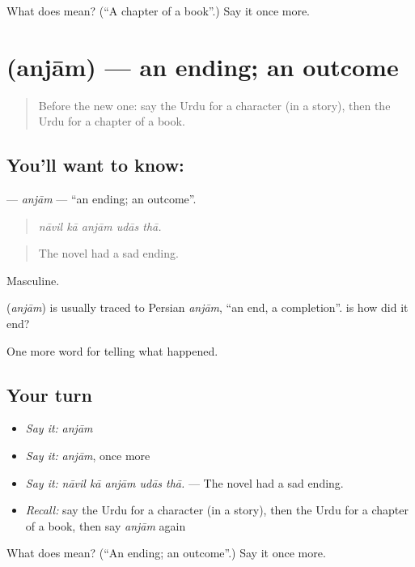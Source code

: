 \begin{tcolorbox}[breakable,colback=teal!4,colframe=teal!35!black,title={Before you move on}]
What does  mean? (\textquotedblleft{}A chapter of a book\textquotedblright{}.) Say it once more.
\end{tcolorbox}
\section[\texorpdfstring{\ur{انجام} (anjām)}{انجام (anjām)}]{ (anjām) — an ending; an outcome}

\label{lesson:UR-C329-anjam}



\begin{quote}
Before the new one: say the Urdu for a character (in a story), then the Urdu for a chapter of a book.
\end{quote}

\subsection*{You'll want to know: }
\textbf{} — \emph{anjām} — \textquotedblleft{}an ending; an outcome\textquotedblright{}.

\begin{quote}
    
\end{quote}

\begin{quote}
\emph{nāvil kā anjām udās thā.}
\end{quote}

\begin{quote}
The novel had a sad ending.
\end{quote}

Masculine.

\begin{cousinweb}
\textbf{} (\emph{anjām}) is usually traced to Persian \emph{anjām}, \textquotedblleft{}an end, a completion\textquotedblright{}. \textbf{  } is how did it end?
\end{cousinweb}

\begin{grammarlens}[title={What you've built}]
One more word for telling what happened.
\end{grammarlens}

\subsection*{Your turn}
\begin{itemize}
\raggedright
  \item \emph{Say it:} \emph{anjām}
  \item \emph{Say it:} \emph{anjām}, once more
  \item \emph{Say it:} \emph{nāvil kā anjām udās thā.} — The novel had a sad ending.
  \item \emph{Recall:} say the Urdu for a character (in a story), then the Urdu for a chapter of a book, then say \emph{anjām} again
\end{itemize}

\begin{tcolorbox}[breakable,colback=teal!4,colframe=teal!35!black,title={Before you move on}]
What does  mean? (\textquotedblleft{}An ending; an outcome\textquotedblright{}.) Say it once more.
\end{tcolorbox}

